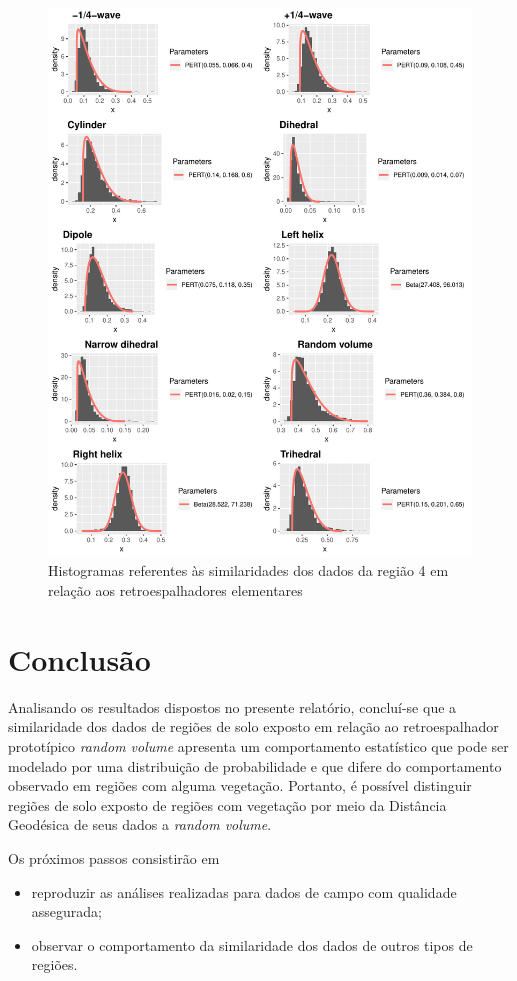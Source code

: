 \documentclass[12pt]{article}
\begin{document}
\begin{figure}[!h]

  \centering
  \includegraphics[width = 0.8\linewidth]{../../Figures/Report_19_02_27/region4_plots.pdf}
  \caption{Histogramas referentes às similaridades dos dados da região 4 em relação aos retroespalhadores elementares}
  \label{fig:hists4}

\end{figure}

\section{Conclusão}

Analisando os resultados dispostos no presente relatório, concluí-se que a similaridade dos dados de regiões de solo exposto em relação ao retroespalhador prototípico \textit{random volume} apresenta um comportamento estatístico que pode ser modelado por uma distribuição de probabilidade e que difere do comportamento observado em regiões com alguma vegetação. Portanto, é possível distinguir regiões de solo exposto de regiões com vegetação por meio da Distância Geodésica de seus dados a \textit{random volume}.

Os próximos passos consistirão em
\begin{itemize}
  \item reproduzir as análises realizadas para dados de campo com qualidade assegurada;
  \item observar o comportamento da similaridade dos dados de outros tipos de regiões.
\end{itemize}
\end{document}
